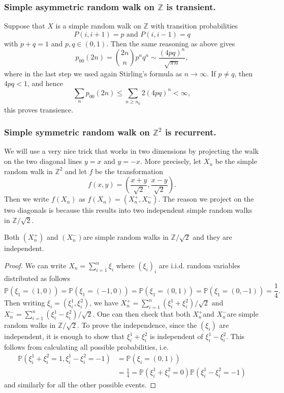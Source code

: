 \documentclass[a4paper]{article}
\begin{document}
\subsubsection*{Simple asymmetric random walk on $ \mathbb{Z} $ is transient.} 
Suppose that $X$ is a simple random walk on $\mathbb{Z}$ with transition probabilities
\[
P(i, i+1)=p \text { and } P(i, i-1)=q
\]
with $p+q=1$ and $p, q \in(0,1)$. Then the same reasoning as above gives
\[
p_{00}(2 n)=\binom{2n}{n} p^n q^n \sim \frac{(4 p q)^n}{\sqrt{\pi n}},
\]
where in the last step we used again Stirling's formula as $n \rightarrow \infty$. If $p \neq q$, then $4 p q<1$, and hence
\[
\sum_n p_{00}(2 n) \leq \sum_{n \geq n_0} 2(4 p q)^n<\infty,
\]
this proves transience.

\subsubsection*{Simple symmetric random walk on $\mathbb{Z}^2$ is recurrent.}
We will use a very nice trick that works in two dimensions by projecting the walk on the two diagonal lines $y=x$ and $y=-x$. More precisely, let $X_n$ be the simple random walk in $\mathbb{Z}^2$ and let $f$ be the transformation
\[
f(x, y)=\left(\frac{x+y}{\sqrt{2}}, \frac{x-y}{\sqrt{2}}\right) .
\]
Then we write $f\left(X_n\right)$ as $f\left(X_n\right)=\left(X_n^{+}, X_n^{-}\right)$.
The reason we project on the two diagonals is because this results into two independent simple random walks in $\mathbb{Z} / \sqrt{2}$.

\begin{lemma}
    Both $\left(X_n^{+}\right)$ and $\left(X_n^{-}\right)$are simple random walks in $\mathbb{Z} / \sqrt{2}$ and they are independent.
\end{lemma}

\begin{proof}
    We can write $X_n=\sum_{i=1}^n \xi_i$ where $\left(\xi_i\right)_i$ are i.i.d. random variables distributed as follows
    \[
    \mathbb{P}\left(\xi_1=(1,0)\right)=\mathbb{P}\left(\xi_1=(-1,0)\right)=\mathbb{P}\left(\xi_1=(0,1)\right)=\mathbb{P}\left(\xi_1=(0,-1)\right)=\frac{1}{4} .
    \]
    Then writing $\xi_i=\left(\xi_i^1, \xi_i^2\right)$, we have $X_n^{+}=\sum_{i=1}^n\left(\xi_i^1+\xi_i^2\right) / \sqrt{2}$ and $X_n^{-}=\sum_{i=1}^n\left(\xi_i^1-\xi_i^2\right) / \sqrt{2}$. One can then check that both $X_n^{+}$and $X_n^{-}$are simple random walks in $\mathbb{Z} / \sqrt{2}$. To prove the independence, since the $\left(\xi_i\right)$ are independent, it is enough to show that $\xi_i^1+\xi_i^2$ is independent of $\xi_i^1-\xi_i^2$. This follows from calculating all possible probabilities, i.e.
    \begin{align*}
        \mathbb{P}\left(\xi_i^1+\xi_i^2=1, \xi_i^1-\xi_i^2=-1\right)&=\mathbb{P}\left(\xi_i=(0,1)\right)\\ 
        &=\frac{1}{4}=\mathbb{P}\left(\xi_i^1+\xi_i^2=0\right) \mathbb{P}\left(\xi_i^1-\xi_i^2=-1\right)
    \end{align*}
    and similarly for all the other possible events.
\end{proof}
\end{document}
